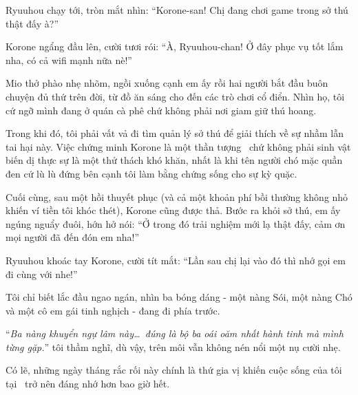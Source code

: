 \documentclass[../main.tex]{subfiles}
\begin{document}

Ryuuhou chạy tới, tròn mắt nhìn: ``Korone-san! Chị đang chơi game trong sở thú thật đấy à?''

Korone ngẩng đầu lên, cười tươi rói: ``À, Ryuuhou-chan! Ở đây phục vụ tốt lắm nha, có cả wifi mạnh nữa nè!''

Mio thở phào nhẹ nhõm, ngồi xuống cạnh em ấy rồi hai người bắt đầu buôn chuyện đủ thứ trên đời, từ đồ ăn sáng cho đến các trò chơi cổ điển. Nhìn họ, tôi cứ ngỡ mình đang ở quán cà phê chứ không phải nơi giam giữ thú hoang.

Trong khi đó, tôi phải vất vả đi tìm quản lý sở thú để giải thích về sự nhầm lẫn tai hại này. Việc chứng minh Korone là một thần tượng \hll\ chứ không phải sinh vật biến dị thực sự là một thử thách khó khăn, nhất là khi tên người chó mặc quần đen cứ lù lù đứng bên cạnh tôi làm bằng chứng sống cho sự kỳ quặc.

Cuối cùng, sau một hồi thuyết phục (và cả một khoản phí bồi thường không nhỏ khiến ví tiền tôi khóc thét), Korone cũng được thả. Bước ra khỏi sở thú, em ấy ngúng nguẩy đuôi, hớn hở nói: ``Ở trong đó trải nghiệm mới lạ thật đấy, cảm ơn mọi người đã đến đón em nha!''

Ryuuhou khoác tay Korone, cười tít mắt: ``Lần sau chị lại vào đó thì nhớ gọi em đi cùng với nhe!''

Tôi chỉ biết lắc đầu ngao ngán, nhìn ba bóng dáng - một nàng Sói, một nàng Chó và một cô em gái tinh nghịch - đang đi phía trước.

``\textit{Ba nàng khuyển ngự lâm này\dots\ đúng là bộ ba oái oăm nhất hành tinh mà mình từng gặp.}'' tôi thầm nghĩ, dù vậy, trên môi vẫn không nén nổi một nụ cười nhẹ.

Có lẽ, những ngày tháng rắc rối này chính là thứ gia vị khiến cuộc sống của tôi tại \hll\ trở nên đáng nhớ hơn bao giờ hết.
\end{document}
